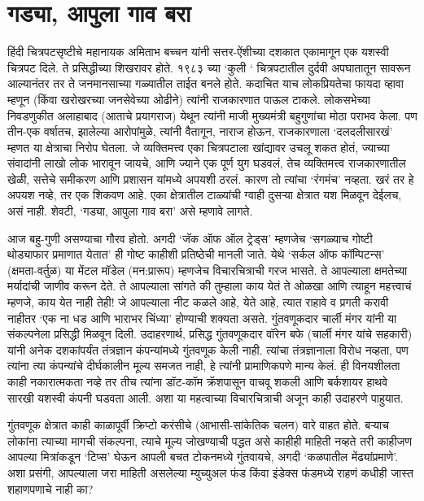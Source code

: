 \chapter{गड्या, आपुला गाव बरा}

हिंदी चित्रपटसृष्टीचे महानायक अमिताभ बच्चन यांनी सत्तर-ऐंशीच्या दशकात एकामागून एक यशस्वी चित्रपट दिले. ते प्रसिद्धीच्या शिखरावर होते. १९८३ च्या ‘कुली ‘ चित्रपटातील दुर्दवी अपघातातून सावरून आल्यानंतर तर ते जनमानसाच्या गळ्यातील ताईत बनले होते. कदाचित याच लोकप्रियतेचा फायदा व्हावा म्हणून (किंवा खरोखरच्या जनसेवेच्या ओढीने) त्यांनी राजकारणात पाऊल टाकले. लोकसभेच्या निवडणुकीत अलाहाबाद (आताचे प्रयागराज) येथून त्यांनी माजी मुख्यमंत्री बहुगुणांचा मोठा पराभव केला. पण तीन-एक वर्षातच, झालेल्या आरोपांमुळे, त्यांनी वैतागून, नाराज होऊन, राजकारणाला ‘दलदलीसारखं’ म्हणत या क्षेत्राचा निरोप घेतला. जे व्यक्तिमत्त्व एका चित्रपटाला खांद्यावर उचलू शकत होतं, ज्याच्या संवादांनी लाखो लोक भारावून जायचे, आणि ज्याने एक पूर्ण युग घडवलं, तेच व्यक्तिमत्त्व राजकारणातील खेळी, सत्तेचे समीकरण आणि प्रशासन यांमध्ये अपयशी ठरलं. कारण तो त्यांचा ‘रंगमंच’ नव्हता. खरं तर हे अपयश नव्हे, तर एक शिकवण आहे. एका क्षेत्रातील टाळ्यांची ग्वाही दुसऱ्या क्षेत्रात यश मिळवून देईलच, असं नाही. शेवटी, ‘गड्या, आपुला गाव बरा’ असे म्हणावे लागते. 

आज बहु-गुणी असण्याचा गौरव होतो. अगदी ‘जॅक ऑफ ऑल ट्रेड्स’ म्हणजेच ‘सगळ्याच गोष्टी थोड्याफार प्रमाणात येतात’ ही गोष्ट काहीशी प्रतिष्ठेची मानली जाते.  येथे ‘सर्कल ऑफ कॉम्पिटन्स’ (क्षमता-वर्तुळ) या मेंटल मॉडेल (मन:प्रारूप) म्हणजेच विचारचित्राची गरज भासते. ते आपल्याला क्षमतेच्या मर्यादांची जाणीव करून देते. ते आपल्याला सांगते की तुम्हाला काय येतं ते ओळखा आणि त्याहून महत्त्वाचं म्हणजे, काय येत नाही तेही! जे आपल्याला नीट कळले आहे, येते आहे, त्यात राहावे व प्रगती करावी नाहीतर ‘एक ना धड आणि भाराभर चिंध्या’ होण्याची शक्यता असते. गुंतवणूकदार चार्ली मंगर यांनी या संकल्पनेला प्रसिद्धी मिळवून दिली. उदाहरणार्थ, प्रसिद्ध गुंतवणूकदार वॉरेन बफे (चार्ली मंगर यांचे सहकारी) यांनी अनेक दशकांपर्यंत तंत्रज्ञान कंपन्यांमध्ये गुंतवणूक केली नाही. त्यांचा तंत्रज्ञानाला विरोध नव्हता, पण त्यांना त्या कंपन्यांचे दीर्घकालीन मूल्य समजत नाही, हे त्यांनी प्रामाणिकपणे मान्य केलं. ही विनयशीलता काही नकारात्मकता नव्हे तर तीच त्यांना डॉट-कॉम क्रॅशपासून वाचवू शकली आणि बर्कशायर हाथवे सारखी यशस्वी कंपनी घडवता आली. अशा या महत्वाच्या विचारचित्राची अजून काही उदाहरणे पाहुयात. 

गुंतवणूक क्षेत्रात काही काळापूर्वी क्रिप्टो करंसीचे (आभासी-सांकेतिक चलन) वारे वाहत होते. बऱ्याच लोकांना त्याच्या मागची संकल्पना, त्याचे मूल्य जोखण्याची पद्धत असे काहीही माहिती नव्हते तरी काहीजण आपल्या मित्रांकडून ‘टिप्स’ घेऊन आपली बचत टोकनमध्ये गुंतवायचे, अगदी ‘कळपातील मेंढ्यांप्रमाणे’. अशा प्रसंगी, आपल्याला जरा माहिती असलेल्या म्युच्युअल फंड किंवा इंडेक्स फंडमध्ये राहणं कधीही जास्त शहाणपणाचे नाही का?


